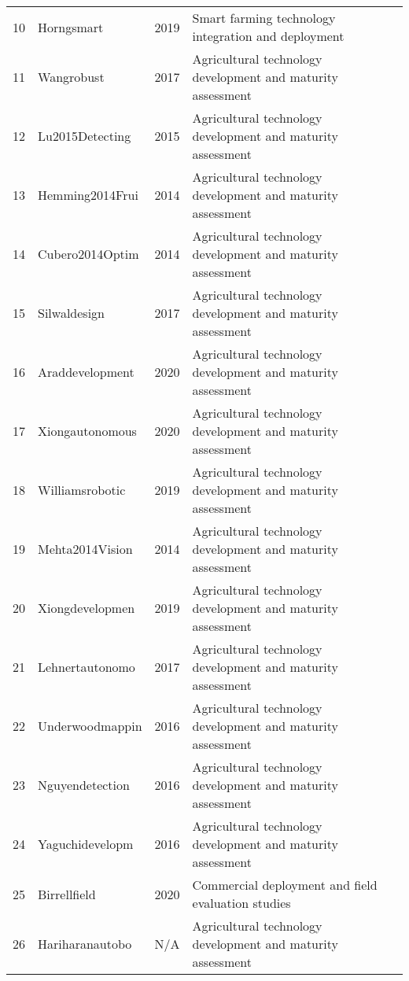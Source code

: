 \begin{table*}[htbp]
\begin{tabular}{p{}p{}p{}p{}p{}}
10 & Horngsmart & 2019 & Smart farming technology integration and deployment & \cite{horng2019smart} \\
11 & Wangrobust & 2017 & Agricultural technology development and maturity assessment & \cite{wang2017robust} \\
12 & Lu2015Detecting & 2015 & Agricultural technology development and maturity assessment & \cite{lu2015detecting} \\
13 & Hemming2014Frui & 2014 & Agricultural technology development and maturity assessment & \cite{hemming2014fruit} \\
14 & Cubero2014Optim & 2014 & Agricultural technology development and maturity assessment & \cite{cubero2014optimised} \\
15 & Silwaldesign & 2017 & Agricultural technology development and maturity assessment & \cite{silwal2017design} \\
16 & Araddevelopment & 2020 & Agricultural technology development and maturity assessment & \cite{arad2020development} \\
17 & Xiongautonomous & 2020 & Agricultural technology development and maturity assessment & \cite{xiong2020autonomous} \\
18 & Williamsrobotic & 2019 & Agricultural technology development and maturity assessment & \cite{williams2019robotic} \\
19 & Mehta2014Vision & 2014 & Agricultural technology development and maturity assessment & \cite{mehta2014vision} \\
20 & Xiongdevelopmen & 2019 & Agricultural technology development and maturity assessment & \cite{xiong2019development} \\
21 & Lehnertautonomo & 2017 & Agricultural technology development and maturity assessment & \cite{lehnert2017autonomous} \\
22 & Underwoodmappin & 2016 & Agricultural technology development and maturity assessment & \cite{underwood2016mapping} \\
23 & Nguyendetection & 2016 & Agricultural technology development and maturity assessment & \cite{nguyen2016detection} \\
24 & Yaguchidevelopm & 2016 & Agricultural technology development and maturity assessment & \cite{yaguchi2016development} \\
25 & Birrellfield & 2020 & Commercial deployment and field evaluation studies & \cite{birrell2020field} \\
26 & Hariharanautobo & N/A & Agricultural technology development and maturity assessment & \cite{hariharanautobot} \\

\end{tabular}
\end{table*}
